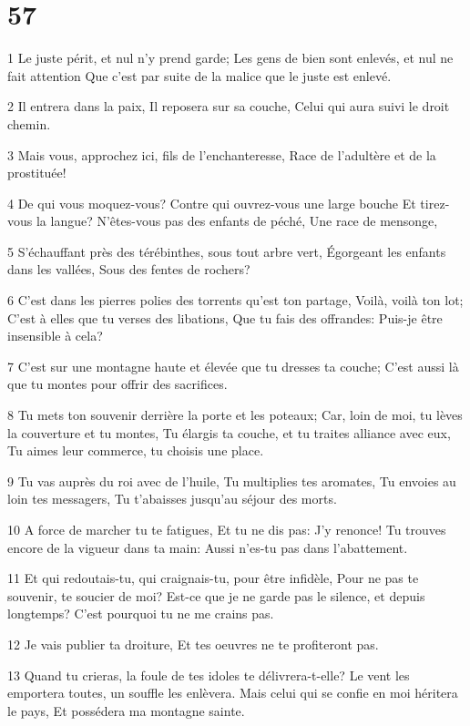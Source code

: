 \chapter{57}

\par 1 Le juste périt, et nul n'y prend garde; Les gens de bien sont enlevés, et nul ne fait attention Que c'est par suite de la malice que le juste est enlevé.
\par 2 Il entrera dans la paix, Il reposera sur sa couche, Celui qui aura suivi le droit chemin.
\par 3 Mais vous, approchez ici, fils de l'enchanteresse, Race de l'adultère et de la prostituée!
\par 4 De qui vous moquez-vous? Contre qui ouvrez-vous une large bouche Et tirez-vous la langue? N'êtes-vous pas des enfants de péché, Une race de mensonge,
\par 5 S'échauffant près des térébinthes, sous tout arbre vert, Égorgeant les enfants dans les vallées, Sous des fentes de rochers?
\par 6 C'est dans les pierres polies des torrents qu'est ton partage, Voilà, voilà ton lot; C'est à elles que tu verses des libations, Que tu fais des offrandes: Puis-je être insensible à cela?
\par 7 C'est sur une montagne haute et élevée que tu dresses ta couche; C'est aussi là que tu montes pour offrir des sacrifices.
\par 8 Tu mets ton souvenir derrière la porte et les poteaux; Car, loin de moi, tu lèves la couverture et tu montes, Tu élargis ta couche, et tu traites alliance avec eux, Tu aimes leur commerce, tu choisis une place.
\par 9 Tu vas auprès du roi avec de l'huile, Tu multiplies tes aromates, Tu envoies au loin tes messagers, Tu t'abaisses jusqu'au séjour des morts.
\par 10 A force de marcher tu te fatigues, Et tu ne dis pas: J'y renonce! Tu trouves encore de la vigueur dans ta main: Aussi n'es-tu pas dans l'abattement.
\par 11 Et qui redoutais-tu, qui craignais-tu, pour être infidèle, Pour ne pas te souvenir, te soucier de moi? Est-ce que je ne garde pas le silence, et depuis longtemps? C'est pourquoi tu ne me crains pas.
\par 12 Je vais publier ta droiture, Et tes oeuvres ne te profiteront pas.
\par 13 Quand tu crieras, la foule de tes idoles te délivrera-t-elle? Le vent les emportera toutes, un souffle les enlèvera. Mais celui qui se confie en moi héritera le pays, Et possédera ma montagne sainte.
